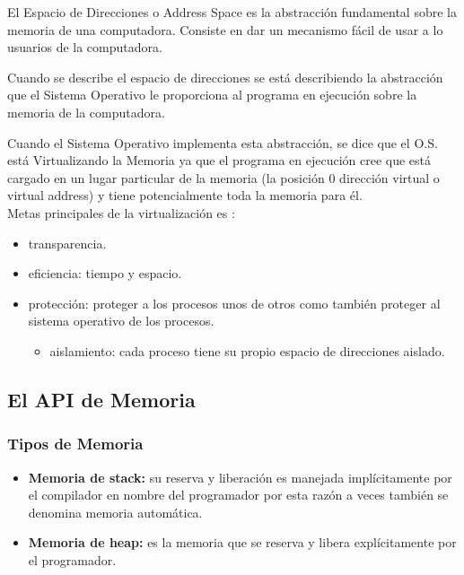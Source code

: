 \documentclass[../main.tex]{subfiles}
\begin{document}
        El Espacio de Direcciones o Address Space es la abstracción fundamental sobre la memoria de una computadora. Consiste en dar un mecanismo fácil de usar a lo usuarios de la computadora.

        Cuando se describe el espacio de direcciones se está describiendo la abstracción que el Sistema Operativo le proporciona al programa en ejecución sobre la memoria de la computadora.

        Cuando el Sistema Operativo implementa esta abstracción, se dice que el O.S. está Virtualizando la Memoria ya que el programa en ejecución cree que está cargado en un lugar particular de la memoria (la posición 0 dirección virtual o virtual address) y tiene potencialmente toda la memoria para él.\\
        
        Metas principales de la virtualización es :
        \begin{itemize}
            \item transparencia.
            \item eficiencia: tiempo y espacio.
            \item protección: proteger a los procesos unos de otros como también proteger al sistema operativo de los procesos.
                \begin{itemize}
                    \item aislamiento: cada proceso tiene su propio espacio de direcciones aislado.
                \end{itemize} 
        \end{itemize}

    \subsection{El API de Memoria}
        \subsubsection{Tipos de Memoria}
            \begin{itemize}
                \item \textbf{Memoria de stack:} su reserva y liberación es manejada implícitamente por el compilador en nombre del programador por esta razón a veces también se denomina memoria automática.
                \item \textbf{Memoria de heap:} es la memoria que se reserva y libera explícitamente por el programador.
            \end{itemize}
\end{document}
